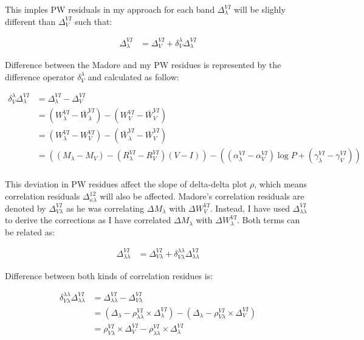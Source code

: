 \documentclass[12pt,a4paper]{article}
\begin{document}
This imples PW residuals in my approach for each band $\Delta_\lambda^{VI}$ will be 
slighly different than $\Delta_V^{VI}$ such that: 


\begin{align*}
    \Delta_\lambda^{VI} & = \Delta_V^{VI}  + \delta_V^\lambda \Delta_\lambda^{VI} 
\end{align*}

Difference between the Madore and my PW residues is represented by the 
difference operator $\delta_V^\lambda$ and calculated as follow:

\begin{align*}
    \delta_V^\lambda \Delta_\lambda^{VI} & = \Delta_\lambda^{VI} - \Delta_V^{VI}\\ 
    & = (W_\lambda^{VI} - \bar{W}_\lambda^{VI}) - (W_V^{VI} - \bar{W}_V^{VI}) \\
    & = (W_\lambda^{VI} - W_V^{VI}) - (\bar{W}_\lambda^{VI} - \bar{W}_V^{VI}) \\
    & = ((M_\lambda - M_V) - (R_\lambda^{VI}-R_V^{VI})(V-I)) - ((\alpha_\lambda^{VI}-\alpha_V^{VI}) \log P + (\gamma_\lambda^{VI} - \gamma_V^{VI})) \\
\end{align*}

This deviation in PW residues affect the slope of delta-delta plot $\rho$, which means correlation residuals $\Delta_{\kappa \lambda}^{12}$ will 
also be affected. Madore's correlation residuals are denoted by $\Delta_{V \lambda}^{VI}$ as he was correlating $\Delta M_\lambda$ with $\Delta W^{VI}_V$. 
Instead, I have used $\Delta_{\lambda \lambda}^{VI}$ to derive the 
corrections as I have correlated  $\Delta M_\lambda$ with $\Delta W^{VI}_\lambda$. Both terms
can be related as:

\begin{align*}
    \Delta_{\lambda \lambda}^{VI} & = \Delta_{V \lambda}^{VI} + \delta_{V \lambda}^{\lambda \lambda} \Delta_{\lambda \lambda}^{VI}  
\end{align*}

Difference between both kinds of correlation residues is:

\begin{align*}
    \delta_{V \lambda}^{\lambda \lambda} \Delta_{\lambda \lambda}^{VI} & = \Delta_{\lambda \lambda}^{VI} - \Delta_{V \lambda}^{VI} \\
    & = (\Delta_\lambda - \rho_{\lambda \lambda}^{VI} \times \Delta_\lambda^{VI}) - (\Delta_\lambda - \rho_{V \lambda}^{VI} \times \Delta_V^{VI}) \\
    & = \rho_{V \lambda}^{VI} \times \Delta_V^{VI} - \rho_{\lambda \lambda}^{VI} \times \Delta_\lambda^{VI} \\
\end{align*}
\end{document}
